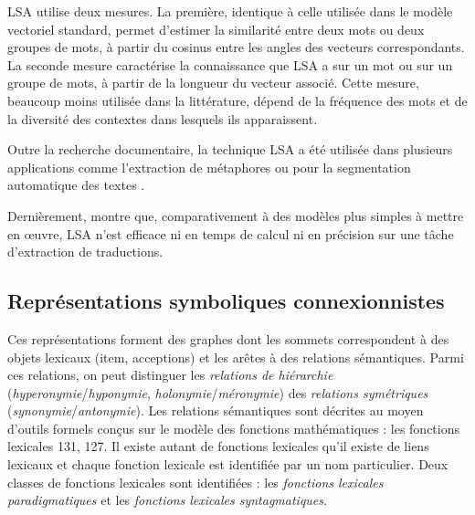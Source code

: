 LSA utilise deux mesures. La première, identique à celle utilisée dans
le modèle vectoriel standard, permet d'estimer la similarité entre
deux mots ou deux groupes de mots, à partir du cosinus entre les
angles des vecteurs correspondants. La seconde mesure caractérise la
connaissance que LSA a sur un mot ou sur un groupe de mots, à partir
de la longueur du vecteur associé. Cette mesure, beaucoup moins
utilisée dans la littérature, dépend de la fréquence des mots et de la
diversité des contextes dans lesquels ils apparaissent.

Outre la recherche documentaire, la technique LSA a été utilisée dans
plusieurs applications comme l'extraction de métaphores
\cite{Kintsch2000} ou pour la segmentation automatique des textes
\cite{Bestgen2004}.

Dernièrement, \cite{GamalloOtero2010} montre que, comparativement à des modèles plus simples à mettre en œuvre,  LSA n'est efficace ni en temps de calcul ni en précision sur une tâche d'extraction de traductions.

\subsection{Représentations symboliques connexionnistes}

Ces représentations forment des graphes dont
les sommets correspondent à des objets lexicaux (item, acceptions) et
les arêtes à des relations sémantiques. Parmi ces relations, on peut distinguer les \emph{relations de
  hiérarchie} (\emph{hyperonymie}/\emph{hyponymie},
\emph{holonymie}/\emph{mérony\-mie}) des \emph{relations
  symétriques} (\emph{synonymie}/\emph{antonymie}). Les relations sémantiques sont décrites au moyen d'outils formels conçus sur le modèle des fonctions mathématiques : les fonctions lexicales \citep{Polguere2003}{131}, \citep{IntroLEC1995}{127}. Il existe autant de fonctions lexicales
qu'il existe de liens lexicaux et chaque fonction lexicale est
identifiée par un nom particulier.  Deux classes de fonctions
lexicales sont identifiées : les
\emph{fonctions lexicales paradigmatiques} et les \emph{fonctions
  lexicales syntagmatiques}.


